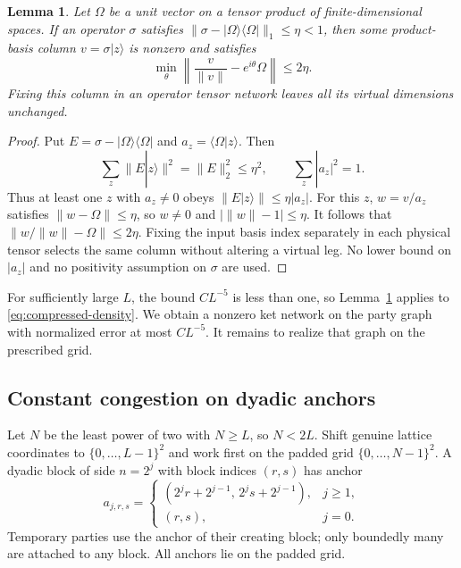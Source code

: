 \documentclass[11pt]{article}
\numberwithin{equation}{section}
\newtheorem{lemma}[theorem]{Lemma}
\theoremstyle{definition}
\theoremstyle{remark}
\newcommand{\norm}[1]{\lVert #1\rVert}
\begin{document}
\begin{lemma}\label{lem:columns}
Let $\Omega$ be a unit vector on a tensor product of finite-dimensional
spaces. If an operator $\sigma$ satisfies
$\norm{\sigma-|\Omega\rangle\langle\Omega|}_1\le\eta<1$, then some
product-basis column $v=\sigma|z\rangle$ is nonzero and satisfies
\[
 \min_\theta\left\|\frac{v}{\norm v}-e^{i\theta}\Omega\right\|
 \le2\eta.
\]
Fixing this column in an operator tensor network leaves all its virtual
dimensions unchanged.
\end{lemma}
\begin{proof}
Put $E=\sigma-|\Omega\rangle\langle\Omega|$ and
$a_z=\langle\Omega|z\rangle$. Then
\[
 \sum_z\norm{E|z\rangle}^2=\norm E_2^2\le\eta^2,
 \qquad \sum_z|a_z|^2=1.
\]
Thus at least one $z$ with $a_z\ne0$ obeys
$\norm{E|z\rangle}\le\eta|a_z|$. For this $z$,
$w=v/a_z$ satisfies $\norm{w-\Omega}\le\eta$, so $w\ne0$ and
$|\norm w-1|\le\eta$. It follows that
$\norm{w/\norm w-\Omega}\le2\eta$.
Fixing the input basis index separately in each physical tensor selects
the same column without altering a virtual leg. No lower bound on
$|a_z|$ and no positivity assumption on $\sigma$ are used.
\end{proof}

For sufficiently large $L$, the bound $CL^{-5}$ is less than one, so
Lemma~\ref{lem:columns} applies to \eqref{eq:compressed-density}. We obtain a
nonzero ket network on the party graph with normalized error at most
$CL^{-5}$. It remains to realize that graph on the prescribed grid.

\subsection{Constant congestion on dyadic anchors}

Let $N$ be the least power of two with $N\ge L$, so $N<2L$.
Shift genuine lattice coordinates to $\{0,\ldots,L-1\}^2$ and work first
on the padded grid $\{0,\ldots,N-1\}^2$. A dyadic block of side $n=2^j$
with block indices $(r,s)$ has anchor
\begin{equation}\label{eq:anchors}
 a_{j,r,s}=\begin{cases}
 (2^jr+2^{j-1},\,2^js+2^{j-1}),&j\ge1,\\
 (r,s),&j=0.
 \end{cases}
\end{equation}
Temporary parties use the anchor of their creating block; only boundedly
many are attached to any block. All anchors lie on the padded grid.
\end{document}
